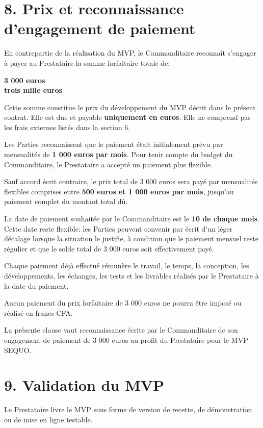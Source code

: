 \documentclass[11pt,a4paper]{article}
\begin{document}
\section*{8. Prix et reconnaissance d'engagement de paiement}

En contrepartie de la réalisation du MVP, le Commanditaire reconnaît s'engager à payer au Prestataire la somme forfaitaire totale de:

\begin{center}
    {\Large \textbf{3 000 euros}}\\
    \textbf{trois mille euros}
\end{center}

Cette somme constitue le prix du développement du MVP décrit dans le présent contrat. Elle est due et payable \textbf{uniquement en euros}. Elle ne comprend pas les frais externes listés dans la section 6.

Les Parties reconnaissent que le paiement était initialement prévu par mensualités de \textbf{1 000 euros par mois}. Pour tenir compte du budget du Commanditaire, le Prestataire a accepté un paiement plus flexible.

Sauf accord écrit contraire, le prix total de 3 000 euros sera payé par mensualités flexibles comprises entre \textbf{500 euros et 1 000 euros par mois}, jusqu'au paiement complet du montant total dû.

La date de paiement souhaitée par le Commanditaire est le \textbf{10 de chaque mois}. Cette date reste flexible: les Parties peuvent convenir par écrit d'un léger décalage lorsque la situation le justifie, à condition que le paiement mensuel reste régulier et que le solde total de 3 000 euros soit effectivement payé.

Chaque paiement déjà effectué rémunère le travail, le temps, la conception, les développements, les échanges, les tests et les livrables réalisés par le Prestataire à la date du paiement.

Aucun paiement du prix forfaitaire de 3 000 euros ne pourra être imposé ou réalisé en francs CFA.

La présente clause vaut reconnaissance écrite par le Commanditaire de son engagement de paiement de 3 000 euros au profit du Prestataire pour le MVP SEQUO.

\section*{9. Validation du MVP}

Le Prestataire livre le MVP sous forme de version de recette, de démonstration ou de mise en ligne testable.
\end{document}
